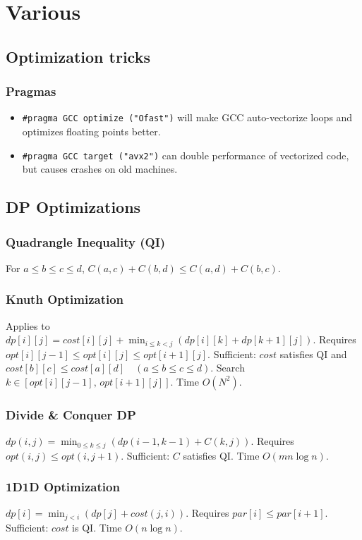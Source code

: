 \chapter{Various}


\section{Optimization tricks}
	\subsection{Pragmas}
		\begin{itemize}
			\item \lstinline{#pragma GCC optimize ("Ofast")} will make GCC auto-vectorize loops and optimizes floating points better.
			\item \lstinline{#pragma GCC target ("avx2")} can double performance of vectorized code, but causes crashes on old machines.
		\end{itemize}

\section{DP Optimizations}
    \subsection{Quadrangle Inequality (QI)}
        For $a \le b \le c \le d$, $C(a,c) + C(b,d) \le C(a,d) + C(b,c).$
    \subsection{Knuth Optimization}
        Applies to $dp[i][j] = cost[i][j] + \min_{i \le k < j} (dp[i][k] + dp[k+1][j]).$
        Requires $opt[i][j-1] \le opt[i][j] \le opt[i+1][j].$
        Sufficient: $cost$ satisfies QI and $cost[b][c] \le cost[a][d] \quad (a \le b \le c \le d).$
        Search $k \in [opt[i][j-1],\, opt[i+1][j]]$. Time $O(N^2)$.
    \subsection{Divide \& Conquer DP}
        $dp(i,j) = \min_{0 \le k \le j} (dp(i-1,k-1) + C(k,j)).$
        Requires $opt(i,j) \le opt(i,j+1)$. Sufficient: $C$ satisfies QI. Time $O(mn\log n)$.
    \subsection{1D1D Optimization}
        $dp[i] = \min_{j<i} (dp[j] + cost(j,i)).$
        Requires $par[i] \le par[i+1]$. Sufficient: $cost$ is QI. Time $O(n\log n)$.


